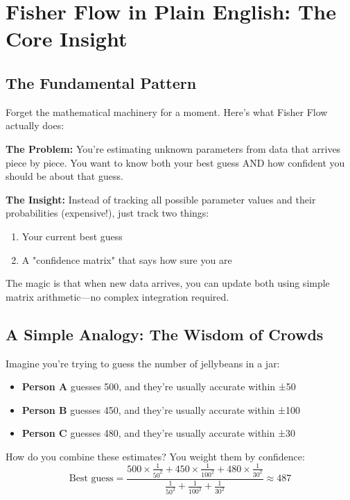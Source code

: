 \documentclass[11pt]{article}
\begin{document}
\section{Fisher Flow in Plain English: The Core Insight}

\subsection{The Fundamental Pattern}

Forget the mathematical machinery for a moment. Here's what Fisher Flow actually does:

\textbf{The Problem:} You're estimating unknown parameters from data that arrives piece by piece. You want to know both your best guess AND how confident you should be about that guess.

\textbf{The Insight:} Instead of tracking all possible parameter values and their probabilities (expensive!), just track two things:
\begin{enumerate}
\item Your current best guess
\item A "confidence matrix" that says how sure you are
\end{enumerate}

The magic is that when new data arrives, you can update both using simple matrix arithmetic—no complex integration required.

\subsection{A Simple Analogy: The Wisdom of Crowds}

Imagine you're trying to guess the number of jellybeans in a jar:

\begin{itemize}
\item \textbf{Person A} guesses 500, and they're usually accurate within ±50
\item \textbf{Person B} guesses 450, and they're usually accurate within ±100
\item \textbf{Person C} guesses 480, and they're usually accurate within ±30
\end{itemize}

How do you combine these estimates? You weight them by confidence:
\begin{equation*}
\text{Best guess} = \frac{500 \times \frac{1}{50^2} + 450 \times \frac{1}{100^2} + 480 \times \frac{1}{30^2}}{\frac{1}{50^2} + \frac{1}{100^2} + \frac{1}{30^2}} \approx 487
\end{equation*}
\end{document}
